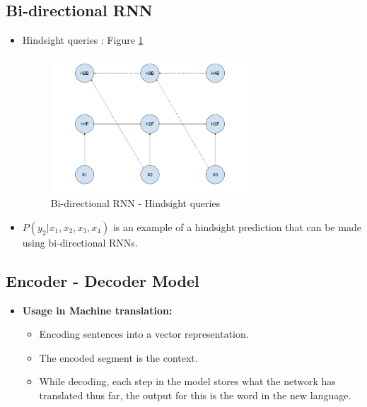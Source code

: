 \documentclass[parskip=half]{scrartcl}
\begin{document}
    \subsection{Bi-directional RNN} %
    \label{sub:bi_directional_rnn}
        \begin{itemize}
            \item Hindsight queries : Figure \ref{fig:bi-directional_rnn}
            \begin{figure}[ht]
            \centering
            \includegraphics[width=0.7\textwidth]{bi-directional_rnn}
            \caption{Bi-directional RNN - Hindsight queries}
            \label{fig:bi-directional_rnn}
        \end{figure}
            \item 
            $P(y_2| x_1, x_2, x_3, x_4)$ is an example of a hindsight prediction that can be made using bi-directional RNNs.
        \end{itemize}

    \subsection{Encoder - Decoder Model} %
    \label{sub:encoder_decoder_model}

        \begin{itemize}
            \item 
            \textbf{Usage in Machine translation:}
            \begin{itemize}
                \item 
                Encoding sentences into a vector representation.
                \item 
                The encoded segment is the context.
                \item 
                While decoding, each step in the model stores what the network has translated thus far, the output for this is the word in the new language.
            \end{itemize}
        \end{itemize}
    
\end{document}
